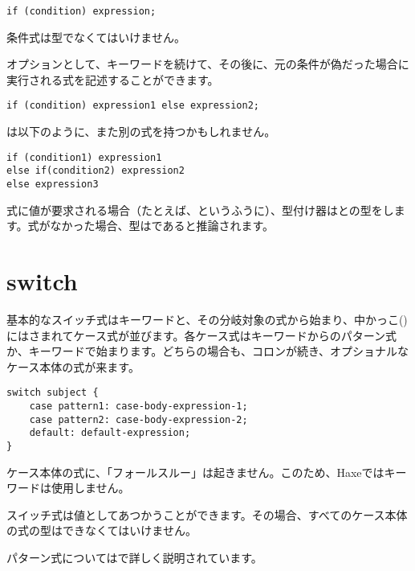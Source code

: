 \begin{lstlisting}
if (condition) expression;
\end{lstlisting}

条件式は型でなくてはいけません。

オプションとして、キーワードを続けて、その後に、元の条件が偽だった場合に実行される式を記述することができます。

\begin{lstlisting}
if (condition) expression1 else expression2;
\end{lstlisting}

は以下のように、また別の式を持つかもしれません。

\begin{lstlisting}
if (condition1) expression1
else if(condition2) expression2
else expression3
\end{lstlisting}

式に値が要求される場合（たとえば、というふうに）、型付け器はとの型をします。式がなかった場合、型はであると推論されます。

\section{switch}
\label{expression-switch}

基本的なスイッチ式はキーワードと、その分岐対象の式から始まり、中かっこ(\expr{\{\}})にはさまれてケース式が並びます。各ケース式はキーワードからのパターン式か、キーワードで始まります。どちらの場合も、コロンが続き、オプショナルなケース本体の式が来ます。

\begin{lstlisting}
switch subject {
	case pattern1: case-body-expression-1;
	case pattern2: case-body-expression-2;
	default: default-expression;
}
\end{lstlisting}

ケース本体の式に、「フォールスルー」は起きません。このため、Haxeではキーワードは使用しません。

スイッチ式は値としてあつかうことができます。その場合、すべてのケース本体の式の型はできなくてはいけません。

パターン式についてはで詳しく説明されています。


